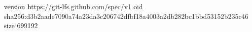 version https://git-lfs.github.com/spec/v1
oid sha256:d3b2aade7090a74a23da3c206742dfbf18a4003a2db282bc1bbd53152b235c46
size 699192
